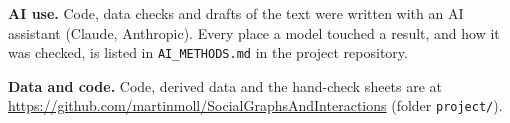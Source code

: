 

\textbf{AI use.} Code, data checks and drafts of the text were written with an AI assistant (Claude, Anthropic).
Every place a model touched a result, and how it was checked, is listed in \texttt{AI\_METHODS.md} in the project
repository.

\textbf{Data and code.} Code, derived data and the hand-check sheets are at
\url{https://github.com/martinmoll/SocialGraphsAndInteractions} (folder \texttt{project/}).
